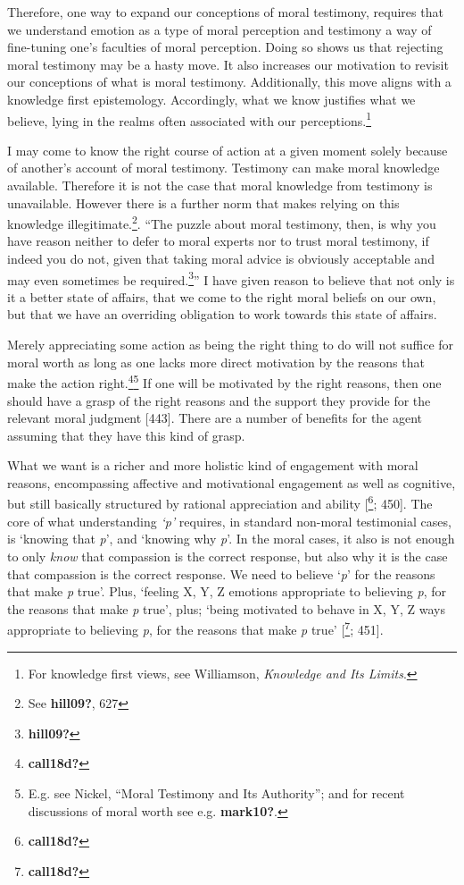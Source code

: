 \documentclass[
  12pt,
]{book}
\theoremstyle{definition}
\theoremstyle{definition}
\theoremstyle{definition}
\theoremstyle{definition}
\theoremstyle{remark}
\begin{document}
Therefore, one way to expand our conceptions of moral testimony, requires that we understand emotion as a type of moral perception and testimony a way of fine-tuning one's faculties of moral perception. Doing so shows us that rejecting moral testimony may be a hasty move. It also increases our motivation to revisit our conceptions of what is moral testimony. Additionally, this move aligns with a knowledge first epistemology. Accordingly, what we know justifies what we believe, lying in the realms often associated with our perceptions.\footnote{For knowledge first views, see Williamson, \emph{Knowledge and {Its Limits}}.}

I may come to know the right course of action at a given moment solely because of another's account of moral testimony. Testimony can make moral knowledge available. Therefore it is not the case that moral knowledge from testimony is unavailable. However there is a further norm that makes relying on this knowledge illegitimate.\footnote{See \textbf{hill09?}, 627}. ``The puzzle about moral testimony, then, is why you have reason neither to defer to moral experts nor to trust moral testimony, if indeed you do not, given that taking moral advice is obviously acceptable and may even sometimes be required.\footnote{\textbf{hill09?}}'' I have given reason to believe that not only is it a better state of affairs, that we come to the right moral beliefs on our own, but that we have an overriding obligation to work towards this state of affairs.

Merely appreciating some action as being the right thing to do will not suffice for moral worth as long as one lacks more direct motivation by the reasons that make the action right.\footnote{\textbf{call18d?}}\footnote{E.g. see Nickel, {``Moral {Testimony} and Its {Authority}''}; and for recent discussions of moral worth see e.g. \textbf{mark10?}.} If one will be motivated by the right reasons, then one should have a grasp of the right reasons and the support they provide for the relevant moral judgment {[}443{]}. There are a number of benefits for the agent assuming that they have this kind of grasp.

What we want is a richer and more holistic kind of engagement with moral reasons, encompassing affective and motivational engagement as well as cognitive, but still basically structured by rational appreciation and ability {[}\footnote{\textbf{call18d?}}; 450{]}. The core of what understanding \emph{`p'} requires, in standard non-moral testimonial cases, is `knowing that \emph{p}', and `knowing why \emph{p}'. In the moral cases, it also is not enough to only \emph{know} that compassion is the correct response, but also why it is the case that compassion is the correct response. We need to believe `\emph{p}' for the reasons that make \emph{p} true'. Plus, `feeling X, Y, Z emotions appropriate to believing \emph{p}, for the reasons that make \emph{p} true', plus; `being motivated to behave in X, Y, Z ways appropriate to believing \emph{p}, for the reasons that make \emph{p} true' {[}\footnote{\textbf{call18d?}}; 451{]}.
\end{document}
